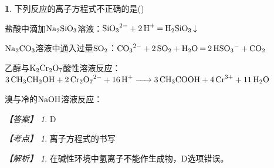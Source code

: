 \documentclass[UTF8, 10pt, a4paper, oneside]{ctexart}
\newcommand{\fs}[1]{{\fangsong #1}}%
\theoremstyle{definition}
\newtheorem{subexercise}{}[exercise]%
\theoremstyle{remark}
\newtheorem*{answer}{【答案】}
\newtheorem*{point}{【考点】}      %
\newtheorem*{explanation}{【解析】}     %
\theoremstyle{plain}
\begin{document}
\begin{subexercise}
    \fs{[2022·6月浙江选考]}下列反应的离子方程式不正确的是\quad (\quad)
    \begin{adjustwidth}{4em}{}
        \begin{asparaenum}[A. ]
            \item 盐酸中滴加$\ce{Na2SiO3}$溶液：$\ce{SiO3^2- + 2H+ = H2SiO3 v}$
            \item $\ce{Na2CO3}$溶液中通入过量$\ce{SO2}$：$\ce{CO3^2- + 2SO2 + H2O = 2HSO3^- + CO2}$
            \item 乙醇与$\ce{K2Cr2O7}$酸性溶液反应：$\ce{3CH3CH2OH + 2Cr2O7^2- + 16H+ -> 3CH3COOH + 4Cr^3+ + 11H2O}$
            \item 溴与冷的$\ce{NaOH}$溶液反应：
        \end{asparaenum}
    \end{adjustwidth}
    \begin{answer}
        D
    \end{answer}
    \begin{point}
        离子方程式的书写
    \end{point}
    \begin{explanation}
        在碱性环境中氢离子不能作生成物，D选项错误。
    \end{explanation}
\end{subexercise}
\end{document}
